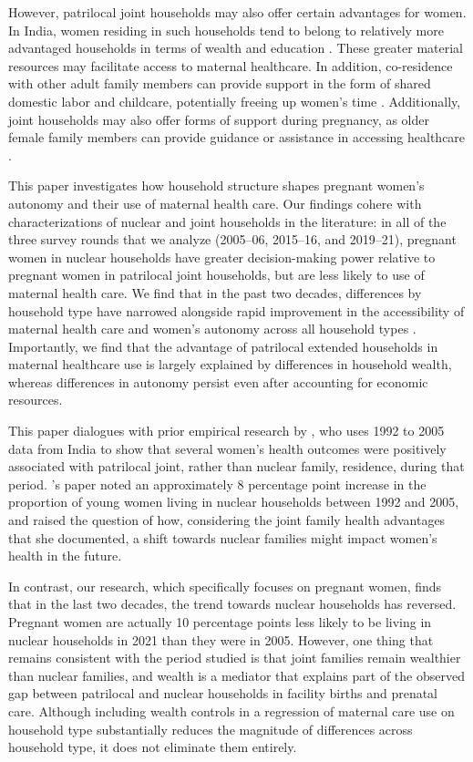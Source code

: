 \documentclass[12pt]{article}
\begin{document}
However, patrilocal joint households may also offer certain advantages for women. In India, women residing in such households tend to belong to relatively more advantaged households in terms of wealth and education \citep{allendorf2012women, breton2021modernisation}. These greater material resources may facilitate access to maternal healthcare. In addition, co-residence with other adult family members can provide support in the form of shared domestic labor and childcare, potentially freeing up women’s time \citep{khanna2024role}. Additionally, joint households may also offer forms of support during pregnancy, as older female family members can provide guidance or assistance in accessing healthcare \citep{varghese2019coresidence}.

This paper investigates how household structure shapes pregnant women's autonomy and their use of maternal health care.  Our findings cohere with characterizations of nuclear and joint households in the literature: in all of the three survey rounds that we analyze (2005–06, 2015–16, and 2019–21), pregnant women in nuclear households have greater decision-making power relative to pregnant women in patrilocal joint households, but are less likely to use of maternal health care.  We find that in the past two decades, differences by household type have narrowed alongside rapid improvement in the accessibility of maternal health care and women's autonomy across all household types \citep{ram2026investigation, gandhi2022predictors, rai2022use}. Importantly, we find that the advantage of patrilocal extended households in maternal healthcare use is largely explained by differences in household wealth, whereas differences in autonomy persist even after accounting for economic resources.

This paper dialogues with prior empirical research by \cite{allendorf2013going}, who uses 1992 to 2005 data from India to show that several women's health outcomes were positively associated with patrilocal joint, rather than nuclear family, residence, during that period.  \cite{allendorf2013going}'s paper noted an approximately 8 percentage point increase in the proportion of young women living in nuclear households between 1992 and 2005, and raised the question of how, considering the joint family health advantages that she documented, a shift towards nuclear families might impact women's health in the future.  

In contrast, our research, which specifically focuses on pregnant women, finds that in the last two decades, the trend towards nuclear households has reversed.  Pregnant women are actually 10 percentage points less likely to be living in nuclear households in 2021 than they were in 2005. However, one thing that remains consistent with the period \cite{allendorf2013going} studied is that joint families remain wealthier than nuclear families, and wealth is a mediator that explains part of the observed gap between patrilocal and nuclear households in facility births and prenatal care. Although including wealth controls in a regression of maternal care use on household type substantially reduces the magnitude of differences across household type, it does not eliminate them entirely.
\end{document}
